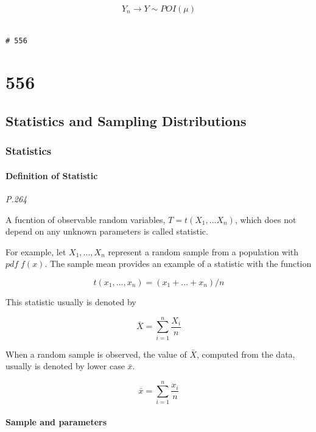 \documentclass[]{book}
\begin{document}
\[Y_n \rightarrow Y \sim POI (\mu)\]

\begin{verbatim}
                                                                        # 556
\end{verbatim}

\hypertarget{section-1}{%
\chapter{556}\label{section-1}}

\hypertarget{statistics-and-sampling-distributions}{%
\section{Statistics and Sampling Distributions}\label{statistics-and-sampling-distributions}}

\hypertarget{statistics}{%
\subsection{Statistics}\label{statistics}}

\hypertarget{definition-of-statistic}{%
\subsubsection{Definition of Statistic}\label{definition-of-statistic}}

\emph{P.264}

A fucntion of observable random variables, \(T=t(X_1, ... X_n)\), which does not depend on any unknown parameters is called statistic.

For example, let \(X_1, ..., X_n\) represent a random sample from a population with \(pdf \;f(x)\). The sample mean provides an example of a statistic with the function

\[t(x_1,...,x_n)=(x_1+...+x_n)/n\]

This statistic usually is denoted by

\[\bar{X}=\sum_{i=1}^n \frac{X_i}{n}\]

When a random sample is observed, the value of \(\bar{X}\), computed from the data, usually is denoted by lower case \(\bar{x}\).

\[\bar{x}=\sum_{i=1}^n \frac{x_i}{n}\]

\hypertarget{sample-and-parameters}{%
\subsubsection{Sample and parameters}\label{sample-and-parameters}}
\end{document}
